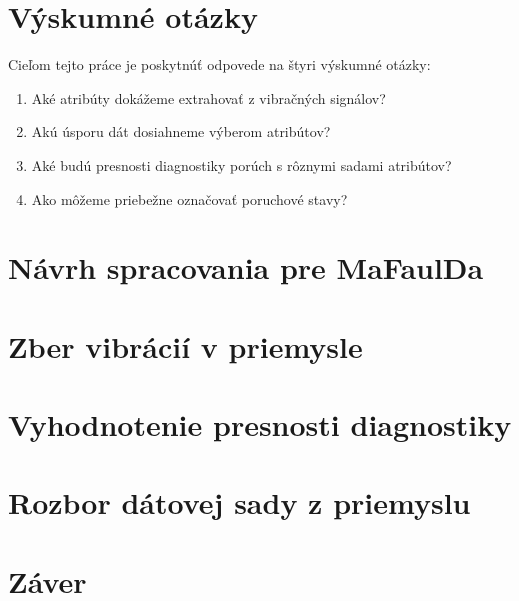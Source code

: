 \section{Výskumné otázky}
Cieľom tejto práce je poskytnúť odpovede na štyri výskumné otázky:
\begin{enumerate}
\itemsep0pt
\item Aké atribúty dokážeme extrahovať z vibračných signálov?
\item Akú úsporu dát dosiahneme výberom atribútov?
\item Aké budú presnosti diagnostiky porúch s rôznymi sadami atribútov?
\item Ako môžeme priebežne označovať poruchové stavy?
\end{enumerate}

\section{Návrh spracovania pre MaFaulDa}

\section{Zber vibrácií v priemysle}

\section{Vyhodnotenie presnosti diagnostiky}

\section{Rozbor dátovej sady z priemyslu}

\section{Záver}

\clearpage